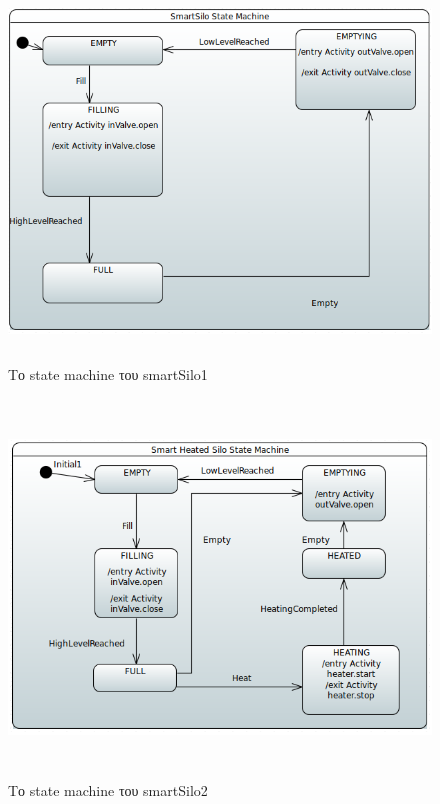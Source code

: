 \begin{figure}[htbp]
	\centering
		\includegraphics[height=10cm,width=15cm]{Figures/17.png}
	\caption{Το state machine του smartSilo1}	
\end{figure}
\begin{figure}[htbp]
	\centering
		\includegraphics[height=10cm,width=15cm]{Figures/18.png}
	\caption{Το state machine του smartSilo2}	
\end{figure}
